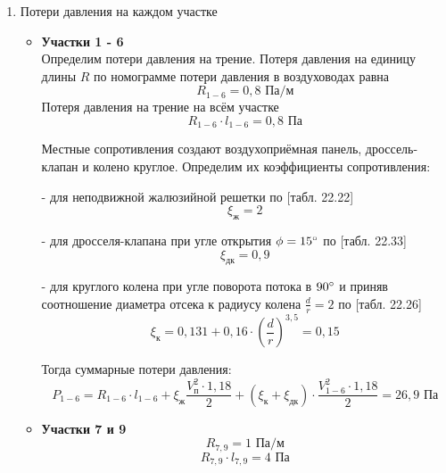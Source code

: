 \begin{enumerate}
    \item   Потери давления на каждом участке
        \begin{itemize}
            \item   \textbf{Участки 1 - 6} \\
                    Определим потери давления на трение. Потеря давления на
                    единицу длины $R$ по номограмме потери давления в воздуховодах равна
                    $$
                        R_{1-6} = 0,8 \text{ Па/м}
                    $$
                    Потеря давления на трение на всём участке
                    $$
                        R_{1-6} \cdot l_{1-6} = 0,8 \text{ Па}
                    $$

                    Местные сопротивления создают воздухоприёмная панель,
                    дроссель-клапан и колено круглое. Определим их коэффициенты
                    сопротивления:

                    - для неподвижной жалюзийной решетки по
                    \cite{air_ventilation_and_conditioning}[табл. 22.22]
                    $$
                        \xi_\text{ж} = 2
                    $$

                    - для дросселя-клапана при угле открытия $\phi = 15 \degree$ по
                    \cite{air_ventilation_and_conditioning}[табл. 22.33]
                    $$
                        \xi_\text{дк} = 0,9
                    $$

                    - для круглого колена при угле поворота потока в $90 \degree$
                    и приняв соотношение диаметра отсека к радиусу колена $\frac{d}{r} = 2$
                    по \cite{air_ventilation_and_conditioning}[табл. 22.26]
                    $$
                        \xi_\text{к} = 0,131 + 0,16 \cdot \left( \frac{d}{r} \right)^{3,5} = 0,15
                    $$

                    Тогда суммарные потери давления:
                    $$
                        P_{1-6} = R_{1-6} \cdot l_{1-6} + \xi_\text{ж} \frac{V_\text{п}^2 \cdot 1,18}{2}
                                    + (\xi_\text{к} + \xi_\text{дк}) \cdot \frac{V_{1-6}^2 \cdot 1,18}{2}
                                = 26,9 \text{ Па}
                    $$

            \item   \textbf{Участки 7 и 9} \\
                    $$
                        R_{7,9} = 1 \text{ Па/м}
                    $$
                    $$
                        R_{7,9} \cdot l_{7,9} = 4 \text{ Па}
                    $$


\end{itemize}
\end{enumerate}
